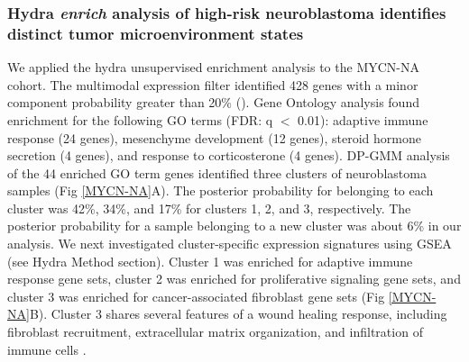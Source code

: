 \documentclass[10pt,letterpaper]{article}
\begin{document}
\subsubsection*{Hydra \textit{enrich} analysis of high-risk neuroblastoma identifies distinct tumor microenvironment states}
We applied the hydra unsupervised enrichment analysis to the MYCN-NA cohort. The multimodal expression filter identified 428 genes with a minor component probability greater than 20\% (). Gene Ontology analysis found enrichment for the following GO terms (FDR: q $<$ 0.01): adaptive immune response (24 genes), mesenchyme development (12 genes), steroid hormone secretion (4 genes), and response to corticosterone (4 genes). DP-GMM analysis of the 44 enriched GO term genes identified three clusters of neuroblastoma samples (Fig \ref{MYCN-NA}A). The posterior probability for belonging to each cluster was 42\%, 34\%, and 17\% for clusters 1, 2, and 3, respectively. The posterior probability for a sample belonging to a new cluster was about 6\% in our analysis. We next investigated cluster-specific expression signatures using GSEA (see Hydra Method section). Cluster 1 was enriched for adaptive immune response gene sets, cluster 2 was enriched for proliferative signaling gene sets, and cluster 3 was enriched for cancer-associated fibroblast gene sets (Fig \ref{MYCN-NA}B). Cluster 3 shares several features of a wound healing response, including fibroblast recruitment, extracellular matrix organization, and infiltration of immune cells \cite{fosterEvolvingRelationshipWound}. 
\end{document}
